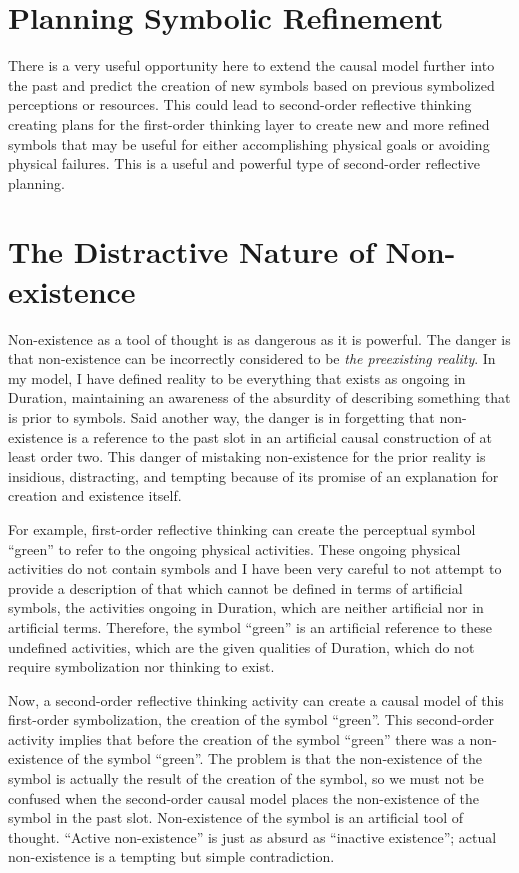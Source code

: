 \section{Planning Symbolic Refinement}

There is a very useful opportunity here to extend the causal model
further into the past and predict the creation of new symbols based on
previous symbolized perceptions or resources.  This could lead to
second-order reflective thinking creating plans for the first-order
thinking layer to create new and more refined symbols that may be
useful for either accomplishing physical goals or avoiding physical
failures.  This is a useful and powerful type of second-order
reflective planning.

\section{The Distractive Nature of Non-existence}

Non-existence as a tool of thought is as dangerous as it is powerful.
The danger is that non-existence can be incorrectly considered to be
\emph{the preexisting reality}.  In my model, I have defined reality
to be everything that exists as ongoing in Duration, maintaining an
awareness of the absurdity of describing something that is prior to
symbols.  Said another way, the danger is in forgetting that
non-existence is a reference to the past slot in an artificial causal
construction of at least order two.  This danger of mistaking
non-existence for the prior reality is insidious, distracting, and
tempting because of its promise of an explanation for creation and
existence itself.

For example, first-order reflective thinking can create the perceptual
symbol ``green'' to refer to the ongoing physical activities.  These
ongoing physical activities do not contain symbols and I have been
very careful to not attempt to provide a description of that which
cannot be defined in terms of artificial symbols, the activities
ongoing in Duration, which are neither artificial nor in artificial
terms.  Therefore, the symbol ``green'' is an artificial reference to
these undefined activities, which are the given qualities of Duration,
which do not require symbolization nor thinking to exist.

Now, a second-order reflective thinking activity can create a causal
model of this first-order symbolization, the creation of the symbol
``green''.  This second-order activity implies that before the
creation of the symbol ``green'' there was a non-existence of the
symbol ``green''.  The problem is that the non-existence of the symbol
is actually the result of the creation of the symbol, so we must not
be confused when the second-order causal model places the
non-existence of the symbol in the past slot.  Non-existence of the
symbol is an artificial tool of thought.  ``Active non-existence'' is
just as absurd as ``inactive existence''; actual non-existence is a
tempting but simple contradiction.

